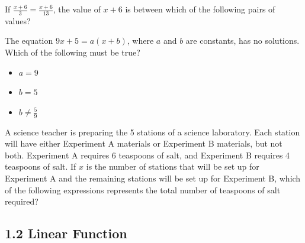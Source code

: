 If \( \frac{x + 6}{3} = \frac{x + 6}{13} \), the value of \( x + 6 \) is between which of the following pairs of values?

\vspace{0.75em}


\vspace{2em}


\noindent\markforreview

\vspace{1em}

The equation \( 9x + 5 = a(x + b) \), where \( a \) and \( b \) are constants, has no solutions.  
Which of the following must be true?

\begin{itemize}
  \item[I.] \( a = 9 \)
  \item[II.] \( b = 5 \)
  \item[III.] \( b \ne \frac{5}{9} \)
\end{itemize}

\vspace{0.75em}


\newpage
\noindent\markforreview

\vspace{1em}

A science teacher is preparing the 5 stations of a science laboratory. Each station will have either Experiment A materials or Experiment B materials, but not both. Experiment A requires 6 teaspoons of salt, and Experiment B requires 4 teaspoons of salt. If \( x \) is the number of stations that will be set up for Experiment A and the remaining stations will be set up for Experiment B, which of the following expressions represents the total number of teaspoons of salt required?

\vspace{0.75em}


\newpage
\subsection*{1.2 Linear Function}
\setcounter{questionnum}{0}


